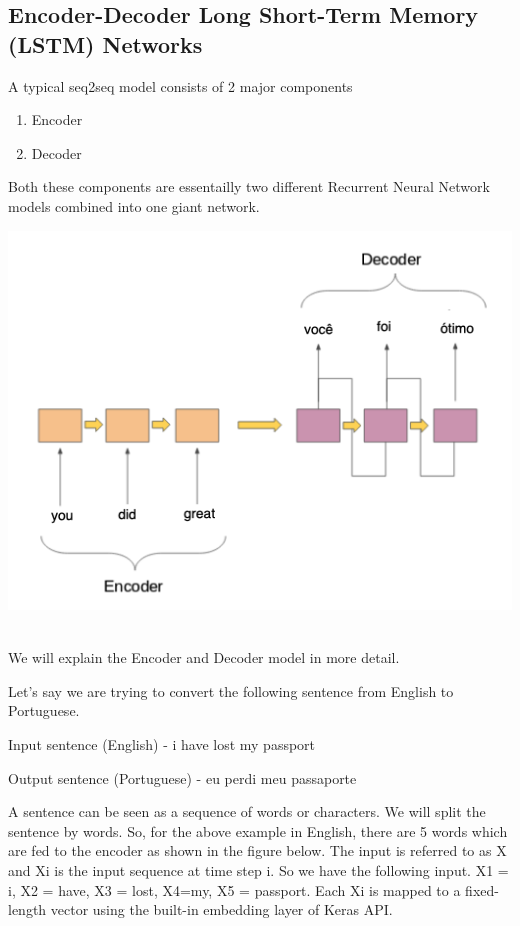 \documentclass[runningheads]{llncs}
\begin{document}
	\subsection{Encoder-Decoder Long Short-Term Memory (LSTM) Networks}	
	A typical seq2seq model consists of 2 major components
	\begin{enumerate}
		\item Encoder
		\item Decoder
	\end{enumerate}
	
	Both these components are essentailly two different Recurrent Neural Network models combined into one giant network.
	
	\begin{minipage}{\linewidth}
		\begin{center}
			\includegraphics[width=\linewidth]{enc_dec_2.png}
			\label{fig:Sequence to Sequence Model}~\cite{ref_url4}
		\end{center}
	\end{minipage}
	\afterpage{\clearpage}
	
	We will explain the  Encoder and Decoder model in more detail.  
	
	Let's say we are trying to convert the following sentence from English to Portuguese.

	Input sentence (English) - i have lost my passport
	
	Output sentence (Portuguese) - eu perdi meu passaporte
	
	A sentence can be seen as a sequence of words or characters. We will split the sentence by words. So, for the above example in English, there are 5 words which are fed to the encoder as shown in the figure below. The input is referred to as X and X{i} is the input sequence at time step i. So we have the following input.
	X{1} = i, X{2} = have, X{3} = lost,  X{4}=my, X{5} = passport.
	Each X{i} is mapped to a fixed-length vector using the built-in embedding layer of Keras API.
	
\end{document}
